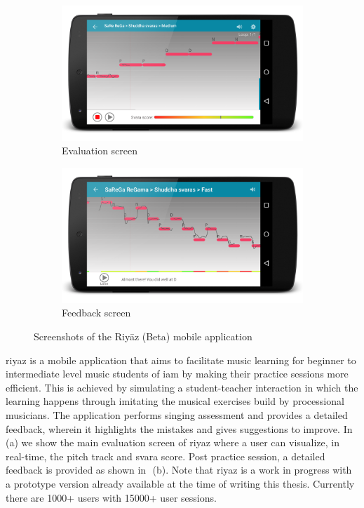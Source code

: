 \begin{figure}
	\begin{subfigure}{\textwidth}
			\centering
		\includegraphics[width=\figSizeSeventy]{ch08_applications/figures/riyaz1.png}
		\caption{Evaluation screen}
		\label{fig:riyaz_evaluation_screen}
	\end{subfigure}
	\begin{subfigure}{\textwidth}
			\centering
		\includegraphics[width=\figSizeSeventy]{ch08_applications/figures/riyaz2.png}
		\caption{Feedback screen}
		\label{fig:riyaz_feedback_screen}
	\end{subfigure}
	\caption{Screenshots of the Riy\={a}z (Beta) mobile application}
	\label{fig:riyaz_screens}
\end{figure}

\gls{riyaz} is a mobile application that aims to facilitate music learning for beginner to intermediate level music students of \gls{iam} by making their practice sessions more efficient. This is achieved by simulating a student-teacher interaction in which the learning happens through imitating the musical exercises build by processional musicians. The application performs singing assessment and provides a detailed feedback, wherein it highlights the mistakes and gives suggestions to improve. In~\,(a) we show the main evaluation screen of \gls{riyaz} where a user can visualize, in real-time, the pitch track and \gls{svara} score. Post practice session, a detailed feedback is provided as shown in~\,(b).  Note that \gls{riyaz} is a work in progress with a prototype version already available at the time of writing this thesis. Currently there are 1000+ users with 15000+ user sessions. 


